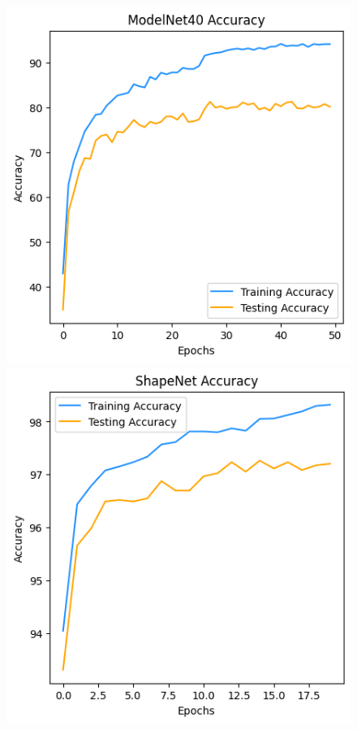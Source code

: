 \documentclass[conference]{IEEEtran}
\begin{document}
\begin{figure}
{        \includegraphics[scale=0.4]{Images/OurCNN/M40/acc.png}
        \includegraphics[scale=0.4]{Images/OurCNN/ShapeNet/acc.png}
}
\end{figure}
\end{document}
